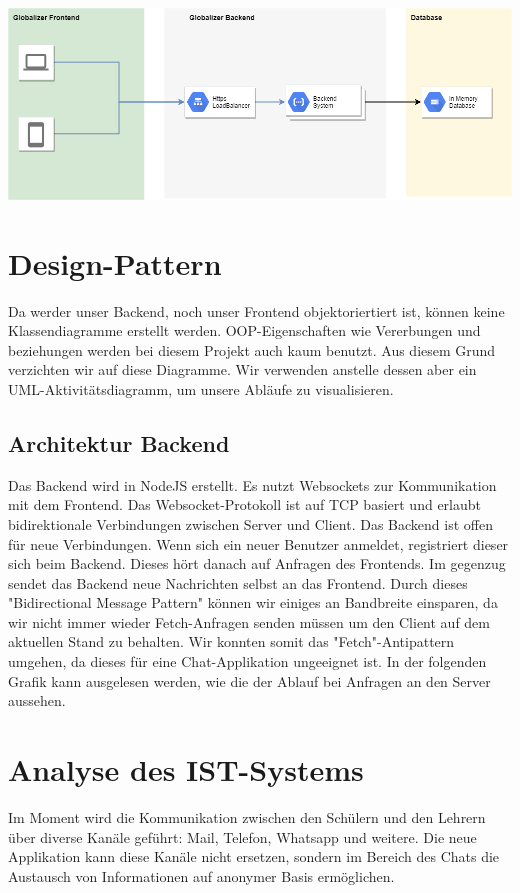 \documentclass[12pt]{article}
\begin{document}
	\noindent
	\includegraphics[width=\linewidth]{system-components.png}
	
	\section{Design-Pattern}
	Da werder unser Backend, noch unser Frontend objektoriertiert ist, können keine Klassendiagramme erstellt werden. OOP-Eigenschaften wie Vererbungen und beziehungen werden bei diesem Projekt auch kaum benutzt. Aus diesem Grund verzichten wir auf diese Diagramme. Wir verwenden anstelle dessen aber ein UML-Aktivitätsdiagramm, um unsere Abläufe zu visualisieren.
	
	\subsection{Architektur Backend}
	Das Backend wird in NodeJS erstellt. Es nutzt Websockets zur Kommunikation mit dem Frontend. Das Websocket-Protokoll ist auf TCP basiert und erlaubt bidirektionale Verbindungen zwischen Server und Client. Das Backend ist offen für neue Verbindungen. Wenn sich ein neuer Benutzer anmeldet, registriert dieser sich beim Backend. Dieses hört danach auf Anfragen des Frontends. Im gegenzug sendet das Backend neue Nachrichten selbst an das Frontend. Durch dieses "Bidirectional Message Pattern" können wir einiges an Bandbreite einsparen, da wir nicht immer wieder Fetch-Anfragen senden müssen um den Client auf dem aktuellen Stand zu behalten. Wir konnten somit das "Fetch"-Antipattern umgehen, da dieses für eine Chat-Applikation ungeeignet ist. In der folgenden Grafik kann ausgelesen werden, wie die der Ablauf bei Anfragen an den Server aussehen.
	
	\section{Analyse des IST-Systems}
	Im Moment wird die Kommunikation zwischen den Schülern und den Lehrern über diverse Kanäle geführt: Mail, Telefon, Whatsapp und weitere. Die neue Applikation kann diese Kanäle nicht ersetzen, sondern im Bereich des Chats die Austausch von Informationen auf anonymer Basis ermöglichen.
	
\end{document}
